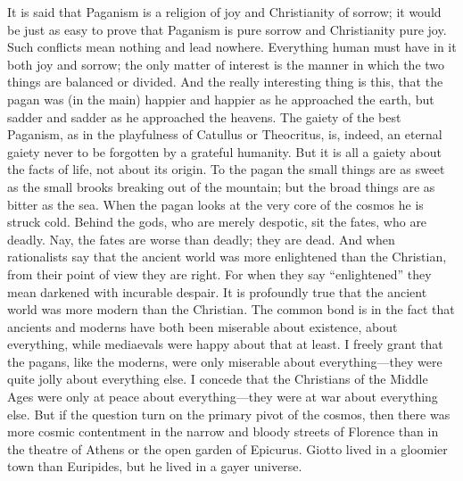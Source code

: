 It is said that Paganism is a religion of joy and Christianity of sorrow; it would be just as easy to prove that Paganism is pure sorrow and Christianity pure joy. Such conflicts mean nothing and lead nowhere. Everything human must have in it both joy and sorrow; the only matter of interest is the manner in which the two things are balanced or divided. And the really interesting thing is this, that the pagan was (in the main) happier and happier as he approached the earth, but sadder and sadder as he approached the heavens. The gaiety of the best Paganism, as in the playfulness of Catullus or Theocritus, is, indeed, an eternal gaiety never to be forgotten by a grateful humanity. But it is all a gaiety about the facts of life, not about its origin. To the pagan the small things are as sweet as the small brooks breaking out of the mountain; but the broad things are as bitter as the sea. When the pagan looks at the very core of the cosmos he is struck cold. Behind the gods, who are merely despotic, sit the fates, who are deadly. Nay, the fates are worse than deadly; they are dead. And when rationalists say that the ancient world was more enlightened than the Christian, from their point of view they are right. For when they say “enlightened” they mean darkened with incurable despair. It is profoundly true that the ancient world was more modern than the Christian. The common bond is in the fact that ancients and moderns have both been miserable about existence, about everything, while mediaevals were happy about that at least. I freely grant that the pagans, like the moderns, were only miserable about everything—they were quite jolly about everything else. I concede that the Christians of the Middle Ages were only at peace about everything—they were at war about everything else. But if the question turn on the primary pivot of the cosmos, then there was more cosmic contentment in the narrow and bloody streets of Florence than in the theatre of Athens or the open garden of Epicurus. Giotto lived in a gloomier town than Euripides, but he lived in a gayer universe.

